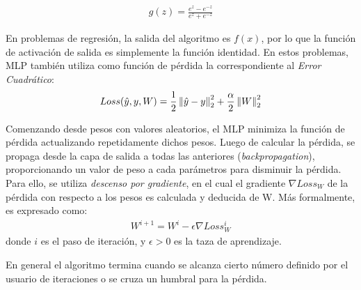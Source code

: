      \begin{align}
        g(z) = \frac{e^{z} - e^{-z}}{e^{z} + e^{-z}}
      \end{align}

      En problemas de regresión, la salida del algoritmo es $f(x)$, por lo que la
      función de activación de salida es simplemente la función identidad. En estos
      problemas, MLP también utiliza como función de pérdida la correspondiente
      al \textit{Error Cuadrático}:
      \begin{align}
        Loss(\hat{y}, y, W) = \frac{1}{2} \left\lVert\hat{y} - y\right\rVert^{2}_{2} + \frac{\alpha}{2} \left\lVert W\right\rVert^{2}_{2}
      \end{align}



    \par Comenzando desde pesos con valores aleatorios, el MLP minimiza la función de
      pérdida actualizando repetidamente dichos pesos. Luego de calcular la pérdida,
      se propaga desde la capa de salida a todas las anteriores (\textit{backpropagation}),
      proporcionando un valor de peso a cada parámetros para disminuir la pérdida.
      Para ello, se utiliza \textit{descenso por gradiente}, en el cual el
      gradiente $\nabla Loss_{W}$ de la pérdida con respecto a los pesos es
      calculada y deducida de W.
      Más formalmente, es expresado como:
      \begin{align}
        W^{i + 1} = W^{i} - \epsilon \nabla Loss^{i}_{W}
      \end{align}
      donde $i$ es el paso de iteración, y $\epsilon > 0$ es la taza de aprendizaje.

      En general el algoritmo termina cuando se alcanza cierto número definido por el
      usuario de iteraciones o se cruza un humbral para la pérdida.


%
